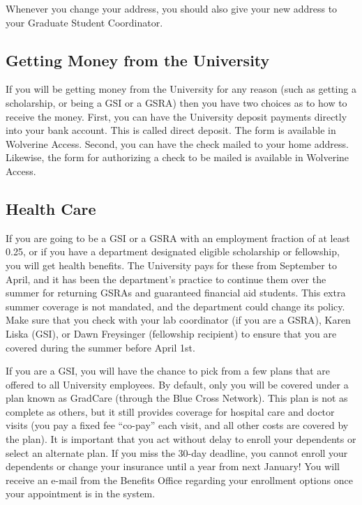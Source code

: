 \documentclass[11pt]{article}
\begin{document}
Whenever you change your address, you should also give your new
address to your Graduate Student Coordinator.
\subsection{Getting Money from the University}
\label{sec-4_2}

If you will be getting money from the University for any reason (such
as getting a scholarship, or being a GSI or a GSRA) then you have two
choices as to how to receive the money.  First, you can have the
University deposit payments directly into your bank account.  This is
called direct deposit.  The form is available in Wolverine Access.
Second, you can have the check mailed to your home address.  Likewise,
the form for authorizing a check to be mailed is available in
Wolverine Access.
\subsection{Health Care}
\label{sec-4_3}

If you are going to be a GSI or a GSRA with an employment fraction of
at least 0.25, or if you have a department designated eligible
scholarship or fellowship, you will get health benefits.  The
University pays for these from September to April, and it has been the
department's practice to continue them over the summer for returning
GSRAs and guaranteed financial aid students.  This extra summer
coverage is not mandated, and the department could change its policy.
Make sure that you check with your lab coordinator (if you are a
GSRA), Karen Liska (GSI), or Dawn Freysinger (fellowship recipient) to
ensure that you are covered during the summer before April 1st.

If you are a GSI, you will have the chance to pick from a few plans
that are offered to all University employees.  By default, only you
will be covered under a plan known as GradCare (through the Blue Cross
Network).  This plan is not as complete as others, but it still
provides coverage for hospital care and doctor visits (you pay a fixed
fee “co-pay” each visit, and all other costs are covered by the plan).
It is important that you act without delay to enroll your dependents
or select an alternate plan.  If you miss the 30-day deadline, you
cannot enroll your dependents or change your insurance until a year
from next January!  You will receive an e-mail from the Benefits
Office regarding your enrollment options once your appointment is in
the system.
\end{document}
